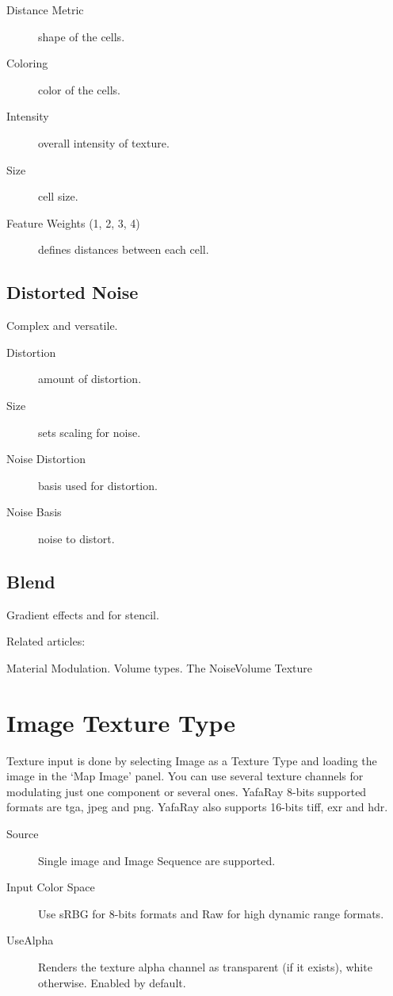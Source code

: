 \begin{description}
\item[Distance Metric] shape of the cells.
\item[Coloring] color of the cells.
\item[Intensity] overall intensity of texture.
\item[Size] cell size.
\item[Feature Weights (1, 2, 3, 4)] defines distances between each cell.
\end{description}

\subsection{Distorted Noise}

Complex and versatile.

\begin{description}
\item[Distortion] amount of distortion.
\item[Size] sets scaling for noise.
\item[Noise Distortion] basis used for distortion.
\item[Noise Basis] noise to distort.
\end{description}

\subsection{Blend}

Gradient effects and for stencil.


Related articles:

Material Modulation.
Volume types.
The NoiseVolume Texture

\section{Image Texture Type}

Texture input is done by selecting Image as a Texture Type and loading the image in the `Map Image' panel. You can use several texture channels for modulating just one component or several ones. YafaRay 8-bits supported formats are tga, jpeg and png. YafaRay also supports 16-bits tiff, exr and hdr.

\begin{description}
\item[Source] Single image and Image Sequence are supported.
\item[Input Color Space] Use sRBG for 8-bits formats and Raw for high dynamic range formats.
\item[UseAlpha] Renders the texture alpha channel as transparent (if it exists), white otherwise. Enabled by default.
\end{description}

